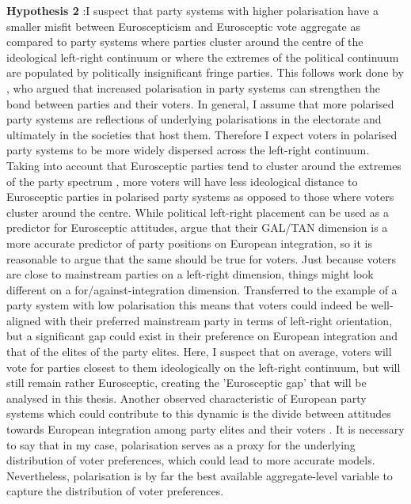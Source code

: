 \textbf{Hypothesis 2} :I suspect that party systems with higher polarisation have a smaller misfit between Euroscepticism and Eurosceptic vote aggregate as compared to party systems where parties cluster around the centre of the ideological left-right continuum or where the extremes of the political continuum are populated by politically insignificant fringe parties. This follows work done by , who argued that increased polarisation in party systems can strengthen the bond between parties and their voters. In general, I assume that more polarised party systems are reflections of underlying polarisations in the electorate and ultimately in the societies that host them. Therefore I expect voters in polarised party systems to be more widely dispersed across the left-right continuum. Taking into account that Eurosceptic parties tend to cluster around the extremes of the party spectrum \cite{Taggart1998,Ray2007}, more voters will have less ideological distance to Eurosceptic parties in polarised party systems as opposed to those where voters cluster around the centre. While political left-right placement can be used as a predictor for Eurosceptic attitudes,  argue that their GAL/TAN dimension is a more accurate predictor of party positions on European integration, so it is reasonable to argue that the same should be true for voters. Just because voters are close to mainstream parties on a left-right dimension, things might look different on a for/against-integration dimension. Transferred to the example of a party system with low polarisation this means that voters could indeed be well-aligned with their preferred mainstream party in terms of left-right orientation, but a significant gap could exist in their preference on European integration and that of the elites of the party elites. Here, I suspect that on average, voters will vote for parties closest to them ideologically on the left-right continuum, but will still remain rather Eurosceptic, creating the 'Eurosceptic gap' that will be analysed in this thesis. Another observed characteristic of European party systems which could contribute to this dynamic is the divide between attitudes towards European integration among party elites and their voters \cite{Hooghe2003}. It is necessary to say that in my case, polarisation serves as a proxy for the underlying distribution of voter preferences, which could lead to more accurate models. Nevertheless, polarisation is by far the best available aggregate-level variable to capture the distribution of voter preferences.

